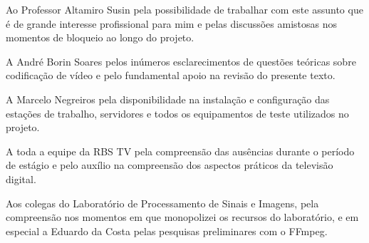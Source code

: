 \documentclass[
	12pt,				%
	openright,			%
	twoside,			%
	a4paper,			%
	brazil,
	french,				%
	english
	]{abntex2}
\begin{document}

\begin{agradecimentos}

Ao Professor Altamiro Susin pela possibilidade de trabalhar com este assunto que é de grande interesse profissional para mim e pelas discussões amistosas nos momentos de bloqueio ao longo do projeto.

A André Borin Soares pelos inúmeros esclarecimentos de questões teóricas sobre codificação de vídeo e pelo fundamental apoio na revisão do presente texto.

A Marcelo Negreiros pela disponibilidade na instalação e configuração das estações de trabalho, servidores e todos os equipamentos de teste utilizados no projeto.

A toda a equipe da RBS TV pela compreensão das ausências durante o período de estágio e pelo auxílio na compreensão dos aspectos práticos da televisão digital.

Aos colegas do Laboratório de Processamento de Sinais e Imagens, pela compreensão nos momentos em que monopolizei os recursos do laboratório, e em especial a Eduardo da Costa pelas pesquisas preliminares com o FFmpeg.

\end{agradecimentos}


\end{document}

